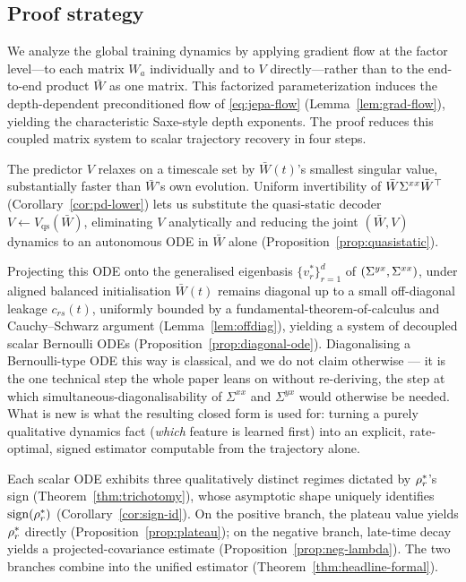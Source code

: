 \subsection*{Proof strategy}
\label{ssec:proof-strategy}

We analyze the global training dynamics by applying gradient flow at the factor
level---to each matrix $W_a$ individually and to $V$ directly---rather than to the
end-to-end product $\bar W$ as one matrix. This factorized parameterization induces
the depth-dependent preconditioned flow of \eqref{eq:jepa-flow}
(Lemma~\ref{lem:grad-flow}), yielding the characteristic Saxe-style depth exponents.
The proof reduces this coupled matrix system to scalar trajectory recovery in four
steps.

The predictor $V$ relaxes on a timescale set by $\bar W(t)$'s smallest singular value,
substantially faster than $\bar W$'s own evolution. Uniform invertibility of
$\bar W\Sigma^{xx}\bar W^\top$ (Corollary~\ref{cor:pd-lower}) lets us substitute the
quasi-static decoder $V \leftarrow V_{\mathrm{qs}}(\bar W)$, eliminating $V$
analytically and reducing the joint $(\bar W, V)$ dynamics to an autonomous ODE in
$\bar W$ alone (Proposition~\ref{prop:quasistatic}).

Projecting this ODE onto the generalised eigenbasis $\{v_r^*\}_{r=1}^d$ of
$(\Sigma^{yx}, \Sigma^{xx})$, under aligned balanced initialisation $\bar W(t)$ remains diagonal up
to a small off-diagonal leakage $c_{rs}(t)$, uniformly bounded by a
fundamental-theorem-of-calculus and Cauchy--Schwarz argument (Lemma~\ref{lem:offdiag}),
yielding a system of decoupled scalar Bernoulli ODEs (Proposition~\ref{prop:diagonal-ode}).
Diagonalising a Bernoulli-type ODE this way is classical, and we do not claim
otherwise --- it is the one technical step the whole paper leans on without
re-deriving, the step at which simultaneous-diagonalisability of $\Sigma^{xx}$ and
$\Sigma^{yx}$ would otherwise be needed. What is new is what the resulting closed form
is used for: turning a purely qualitative dynamics fact (\emph{which} feature is
learned first) into an explicit, rate-optimal, signed estimator computable from the
trajectory alone.

Each scalar ODE exhibits three qualitatively distinct regimes dictated by
$\rho_r^*$'s sign (Theorem~\ref{thm:trichotomy}), whose asymptotic shape uniquely
identifies $\operatorname{sign}(\rho_r^*)$ (Corollary~\ref{cor:sign-id}). On the
positive branch, the plateau value yields $\rho_r^*$ directly
(Proposition~\ref{prop:plateau}); on the negative branch, late-time decay yields a
projected-covariance estimate (Proposition~\ref{prop:neg-lambda}). The two branches
combine into the unified estimator (Theorem~\ref{thm:headline-formal}).

